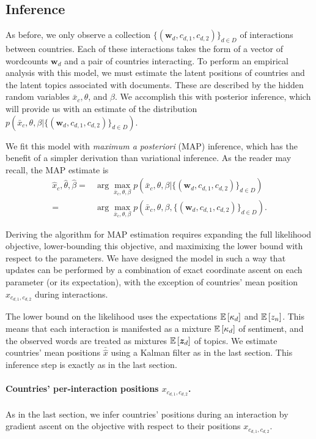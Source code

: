 \subsection{Inference}
As before, we only observe a collection $\{ (\bm w_d, c_{d,1},
c_{d,2}) \}_{d \in D}$ of interactions between countries.  Each of
these interactions takes the form of a vector of wordcounts $\bm w_d$
and a pair of countries interacting.  To perform an empirical analysis
with this model, we must estimate the latent positions of countries
and the latent topics associated with documents.  These are described
by the hidden random variables $\bar x_c, \theta$, and $\beta$.
We accomplish this with posterior inference, which will provide us
with an estimate of the distribution $p(\bar x_c, \theta, \beta |
\{ (\bm w_d, c_{d,1}, c_{d,2}) \}_{d \in D})$.

We fit this model with \emph{maximum a posteriori} (MAP) inference,
which has the benefit of a simpler derivation than variational
inference.  As the reader may recall, the MAP estimate is
\begin{align}
  \hat x_c, \hat \theta, \hat \beta
  = & \arg \max_{\bar x_c, \theta, \beta} p(\bar x_c, \theta, \beta | \{ (\bm w_d, c_{d,1}, c_{d,2}) \}_{d \in D}) \nonumber \\
  = & \arg \max_{\bar x_c, \theta, \beta} p(\bar x_c, \theta, \beta, \{ (\bm w_d, c_{d,1}, c_{d,2}) \}_{d \in D}). \label{equation:fr_unsupervised_map_likelihood}
\end{align}

Deriving the algorithm for MAP estimation requires expanding the full
likelihood objective, lower-bounding this objective, and maximixing
the lower bound with respect to the parameters.  We have designed the
model in such a way that updates can be performed by a combination of
exact coordinate ascent on each parameter (or its expectation), with
the exception of countries' mean position $\hat x_{c_{d,1}, c_{d,2}}$
during interactions.

The lower bound on the likelihood uses the expectations
$\mathbb{E}\left[\kappa_d\right]$ and $\mathbb{E}\left[z_n\right]$.  This means that each
interaction is manifested as a mixture $\mathbb{E}\left[\kappa_d\right]$ of
sentiment, and the observed words are treated as mixtures $\mathbb{E}\left[\bm
  z_d\right]$ of topics.  We estimate countries' mean positions $\bar \hat
x$ using a Kalman filter \citep{kalman:1960} as in the last section.
This inference step is exactly as in the last section.


\paragraph{Countries' per-interaction positions $x_{c_{d,1}, c_{d,2}}$.}
As in the last section, we infer countries' positions during an
interaction by gradient ascent on the objective with respect to their
positions $x_{c_{d,1}, c_{d,2}}$.


